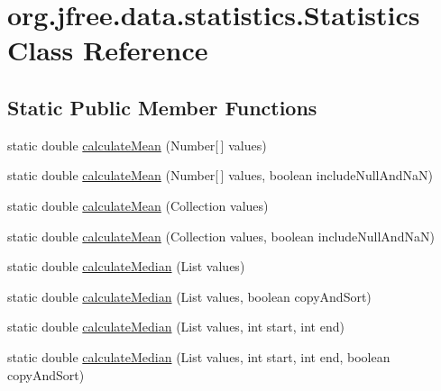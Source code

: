 \hypertarget{classorg_1_1jfree_1_1data_1_1statistics_1_1_statistics}{}\section{org.\+jfree.\+data.\+statistics.\+Statistics Class Reference}
\label{classorg_1_1jfree_1_1data_1_1statistics_1_1_statistics}
\subsection*{Static Public Member Functions}
\begin{DoxyCompactItemize}
\item 
static double \mbox{\hyperlink{classorg_1_1jfree_1_1data_1_1statistics_1_1_statistics_a793d7b5028cb1856231d904d9ab169fd}{calculate\+Mean}} (Number\mbox{[}$\,$\mbox{]} values)
\item 
static double \mbox{\hyperlink{classorg_1_1jfree_1_1data_1_1statistics_1_1_statistics_a0a7d049ddd8817616317ebbdfb542dd1}{calculate\+Mean}} (Number\mbox{[}$\,$\mbox{]} values, boolean include\+Null\+And\+NaN)
\item 
static double \mbox{\hyperlink{classorg_1_1jfree_1_1data_1_1statistics_1_1_statistics_a27d86921cd629adfb4e11cc25f31889b}{calculate\+Mean}} (Collection values)
\item 
static double \mbox{\hyperlink{classorg_1_1jfree_1_1data_1_1statistics_1_1_statistics_ad7edaf335d8f7fe9ce148b02dc317cd6}{calculate\+Mean}} (Collection values, boolean include\+Null\+And\+NaN)
\item 
static double \mbox{\hyperlink{classorg_1_1jfree_1_1data_1_1statistics_1_1_statistics_a83928ff9ff68a235326afd8fbdcab73d}{calculate\+Median}} (List values)
\item 
static double \mbox{\hyperlink{classorg_1_1jfree_1_1data_1_1statistics_1_1_statistics_a473dcad23f5bb87f704c62562554c89b}{calculate\+Median}} (List values, boolean copy\+And\+Sort)
\item 
static double \mbox{\hyperlink{classorg_1_1jfree_1_1data_1_1statistics_1_1_statistics_aa3d422f68c55c28884922f3060f455e5}{calculate\+Median}} (List values, int start, int end)
\item 
static double \mbox{\hyperlink{classorg_1_1jfree_1_1data_1_1statistics_1_1_statistics_a92e227d45c4996f2aed412ae87cd17ba}{calculate\+Median}} (List values, int start, int end, boolean copy\+And\+Sort)
\item 

\end{DoxyCompactItemize}
